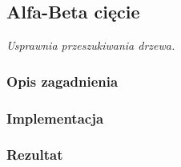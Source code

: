 \subsection{Alfa-Beta cięcie}
\label{subsec:alfa-beta-ciecie}
\textit{Usprawnia przeszukiwania drzewa.}

\subsubsection{Opis zagadnienia}
\subsubsection{Implementacja}
\subsubsection{Rezultat}
